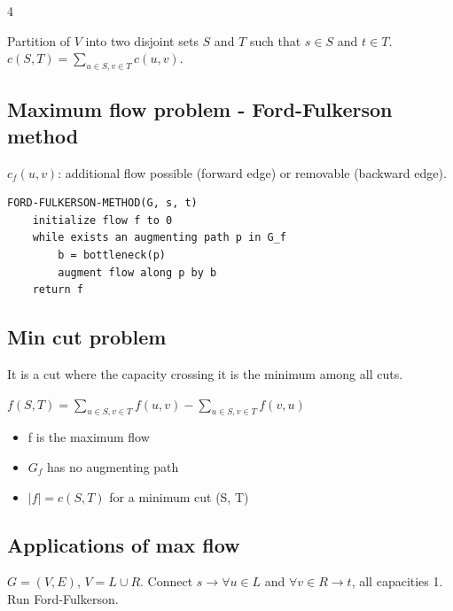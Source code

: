\documentclass[8pt,a4paper,landscape]{extarticle}
\begin{document}
\begin{multicols*}{4}
\begin{defn}[title=Cut]
Partition of $V$ into two disjoint sets $S$ and $T$ such that $s\in S$ and $t\in T$. $c(S,T)=\sum_{u\in S, v\in T} c(u,v)$.
\end{defn}

\subsection{Maximum flow problem - Ford-Fulkerson method}

\begin{prop}[title={Residual network $G_f=(V,E_f)$}]
$c_f(u,v)$: additional flow possible (forward edge) or removable (backward edge).
\end{prop}

\begin{lstlisting}
FORD-FULKERSON-METHOD(G, s, t)
    initialize flow f to 0
    while exists an augmenting path p in G_f
        b = bottleneck(p)
        augment flow along p by b
    return f
\end{lstlisting}

\subsection{Min cut problem}

\begin{defn}[title=Min cut]
It is a cut where the capacity crossing it is the minimum among all cuts.
\end{defn}

\begin{prop}[title=Net flow accross cut]
$f(S,T) = \sum_{u\in S, v\in T} f(u,v) - \sum_{u\in S, v\in T} f(v,u)$
\end{prop}

\begin{thm}[title=Max-flow min-cut theorem ($\Leftrightarrow$)]
\begin{itemize}
  \item f is the maximum flow
  \item $G_f$ has no augmenting path
  \item $|f| = c(S,T)$ for a minimum cut (S, T)
\end{itemize}
\end{thm}

\subsection{Applications of max flow}
\begin{prop}[title=Bipartite matching as flow]
$G=(V,E)$, $V=L\cup R$. Connect $s\to\forall u\in L$ and $\forall v\in R\to t$, all capacities 1. Run Ford-Fulkerson.
\end{prop}


\end{multicols*}
\end{document}
